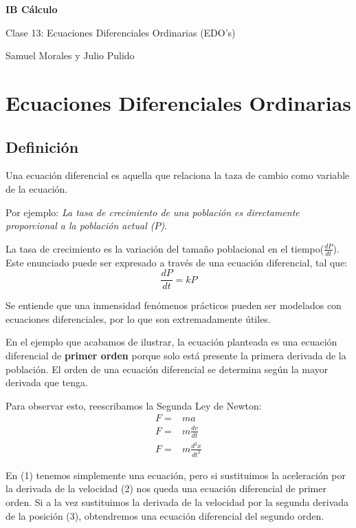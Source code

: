 \documentclass[spanish,12pt]{article}
\begin{document}
	\begin{titlepage}
	\begin{center}
	\hspace{0pt}
	\vfill
	{\Large\textbf{{IB Cálculo}}}
	
	\medskip
	Clase 13: Ecuaciones Diferenciales Ordinarias (EDO's)
	
	\medskip
    Samuel Morales y Julio Pulido
	
	\thispagestyle{empty}
	\vfill
	\end{center}
	\end{titlepage}
\newpage
\tableofcontents
\newpage
\section{Ecuaciones Diferenciales Ordinarias}
\subsection{Definición}
Una ecuación diferencial es aquella que relaciona la taza de cambio como variable de la ecuación. 

Por ejemplo: \textit{La tasa de crecimiento de una población es directamente proporcional a la población actual ($P$)}.

La tasa de crecimiento es la variación del tamaño poblacional en el tiempo($\frac{dP}{dt}$). Este enunciado puede ser expresado a través de una ecuación diferencial, tal que:
$$\frac{dP}{dt}=kP$$

Se entiende que una inmensidad fenómenos prácticos pueden ser modelados con ecuaciones diferenciales, por lo que son extremadamente útiles.

En el ejemplo que acabamos de ilustrar, la ecuación planteada es una ecuación diferencial de \textbf{primer orden} porque solo está presente la primera derivada de la población. El orden de una ecuación diferencial se determina según la mayor derivada que tenga. 

Para observar esto, reescribamos la Segunda Ley de Newton:
\begin{align}
    F=&ma\\
    F=&m\frac{dv}{dt}\\
    F=&m\frac{d^2x}{dt^2}
\end{align}

En (1) tenemos simplemente una ecuación, pero si sustituimos la aceleración por la derivada de la velocidad (2) nos queda una ecuación diferencial de primer orden. Si a la vez sustituimos la derivada de la velocidad por la segunda derivada de la posición (3), obtendremos una ecuación diferencial del segundo orden.
\end{document}
